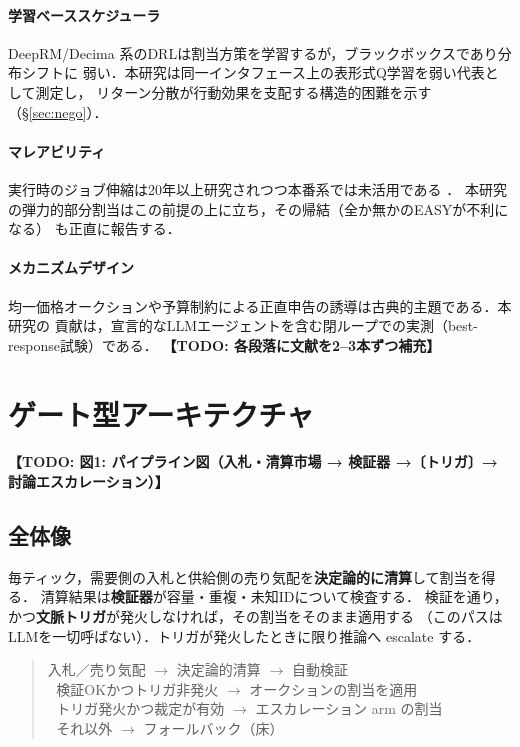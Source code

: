\documentclass[uplatex,twocolumn,fontsize=9pt,paper=a4]{jlreq}
\newcommand{\todo}[1]{\textbf{【TODO: #1】}}
\begin{document}
\paragraph{学習ベーススケジューラ}
DeepRM/Decima 系のDRLは割当方策を学習するが，ブラックボックスであり分布シフトに
弱い．本研究は同一インタフェース上の表形式Q学習を弱い代表として測定し，
リターン分散が行動効果を支配する構造的困難を示す（\S\ref{sec:nego}）．
\paragraph{マレアビリティ}
実行時のジョブ伸縮は20年以上研究されつつ本番系では未活用である \cite{tarraf2024}．
本研究の弾力的部分割当はこの前提の上に立ち，その帰結（全か無かのEASYが不利になる）
も正直に報告する．
\paragraph{メカニズムデザイン}
均一価格オークションや予算制約による正直申告の誘導は古典的主題である．本研究の
貢献は，宣言的なLLMエージェントを含む閉ループでの実測（best-response試験）である．
\todo{各段落に文献を2--3本ずつ補充}

\section{ゲート型アーキテクチャ}\label{sec:design}
\todo{図1: パイプライン図（入札・清算市場 → 検証器 →〔トリガ〕→ 討論エスカレーション）}

\subsection{全体像}
毎ティック，需要側の入札と供給側の売り気配を\textbf{決定論的に清算}して割当を得る．
清算結果は\textbf{検証器}が容量・重複・未知IDについて検査する．
検証を通り，かつ\textbf{文脈トリガ}が発火しなければ，その割当をそのまま適用する
（このパスはLLMを一切呼ばない）．トリガが発火したときに限り推論へ escalate する．

\begin{quote}\small
入札／売り気配 $\rightarrow$ 決定論的清算 $\rightarrow$ 自動検証\\
$\;$ 検証OKかつトリガ非発火 $\rightarrow$ オークションの割当を適用\\
$\;$ トリガ発火かつ裁定が有効 $\rightarrow$ エスカレーション arm の割当\\
$\;$ それ以外 $\rightarrow$ フォールバック（床）
\end{quote}
\end{document}

